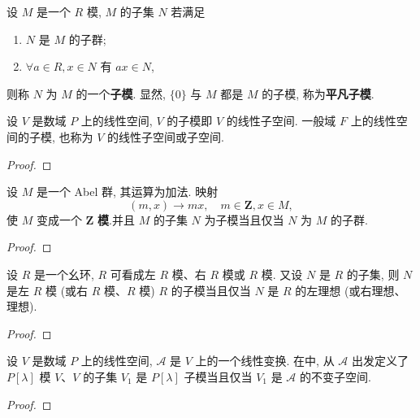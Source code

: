 \documentclass[../../main.tex]{subfiles}
\begin{document}
\begin{definition}
设 \( M \) 是一个 \( R \) 模, \( M \) 的子集 \( N \) 若满足
\begin{enumerate}[(1)]
\item \( N \) 是 \( M \) 的子群;
\item \( \forall a \in R, x \in N \) 有 \( ax \in N \),
\end{enumerate}
则称 \( N \) 为 \( M \) 的一个\textbf{子模}.
显然, \( \{0\} \) 与 \( M \) 都是 \( M \) 的子模, 称为\textbf{平凡子模}.
\end{definition}

\begin{example}
设 \( V \) 是数域 \( P \) 上的线性空间, \( V \) 的子模即 \( V \) 的线性子空间. 一般域 \( F \) 上的线性空间的子模, 也称为 \( V \) 的线性子空间或子空间.
\end{example}
\begin{proof}

\end{proof}

\begin{example}
设 \( M \) 是一个 Abel 群, 其运算为加法. 映射
\[
(m,x) \to mx, \quad m \in \mathbf{Z}, x \in M,
\]
使 \( M \) 变成一个 \( \boldsymbol{Z} \) \textbf{模}.并且 \( M \) 的子集 \( N \) 为子模当且仅当 \( N \) 为 \( M \) 的子群.
\end{example}
\begin{proof}

\end{proof}

\begin{example}
设 \( R \) 是一个幺环, \( R \) 可看成左 \( R \) 模、右 \( R \) 模或 \( R \) 模. 又设 \( N \) 是 \( R \) 的子集, 则 \( N \) 是左 \( R \) 模 (或右 \( R \) 模、\( R \) 模) \( R \) 的子模当且仅当 \( N \) 是 \( R \) 的左理想 (或右理想、理想).
\end{example}
\begin{proof}

\end{proof}

\begin{example}
设 \( V \) 是数域 \( P \) 上的线性空间, \( \mathcal{A} \) 是 \( V \) 上的一个线性变换. 在中, 从 \( \mathcal{A} \) 出发定义了 \( P[\lambda] \) 模 \( V \)、\( V \) 的子集 \( V_1 \) 是 \( P[\lambda] \) 子模当且仅当 \( V_1 \) 是 \( \mathcal{A} \) 的不变子空间.
\end{example}
\begin{proof}

\end{proof}
\end{document}
